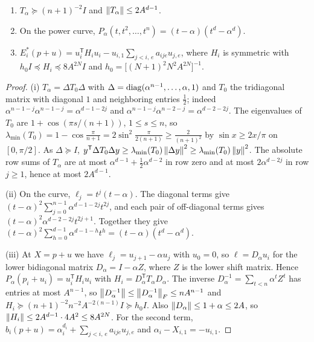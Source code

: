 \begin{lemma}
\label{lem:reductions-local-exposing}
\leavevmode
\begin{enumerate}[label=(\roman*)]
\item $T_\alpha\succeq(n+1)^{-2}I$ and $\left\lVert T_\alpha\right\rVert\le2A^{d-1}$.
\item On the power curve, $P_\alpha(t,t^2,\ldots,t^n)=(t-\alpha)(t^d-\alpha^d)$.
\item $E_i^*(p+u)=u_i^{\mathsf T}H_iu_i-u_{i,1}\sum_{j<i,\,e}a_{ije}u_{j,e}$, where
$H_i$ is symmetric with $h_0I\preceq H_i\preceq8A^{2N}I$ and
$h_0=\bigl[(N+1)^2N^2A^{2N}\bigr]^{-1}$.
\end{enumerate}
\end{lemma}

\begin{proof}
(i) $T_\alpha=\Delta T_0\Delta$ with $\Delta=\operatorname{diag}(\alpha^{n-1},\ldots,\alpha,1)$
and $T_0$ the tridiagonal matrix with diagonal $1$ and neighboring entries
$\frac12$; indeed
$\alpha^{n-1-j}\alpha^{n-1-j}=\alpha^{d-1-2j}$ and
$\alpha^{n-1-j}\alpha^{n-2-j}=\alpha^{d-2-2j}$. The eigenvalues of $T_0$ are
$1+\cos(\pi s/(n+1))$, $1\le s\le n$, so
$\lambda_{\min}(T_0)=1-\cos\frac{\pi}{n+1}=2\sin^2\frac{\pi}{2(n+1)}\ge\frac2{(n+1)^2}$
by $\sin x\ge2x/\pi$ on $[0,\pi/2]$. As $\Delta\succeq I$,
$y^{\mathsf T}\Delta T_0\Delta y\ge\lambda_{\min}(T_0)\left\lVert\Delta y\right\rVert^2\ge
\lambda_{\min}(T_0)\left\lVert y\right\rVert^2$. The absolute row sums of $T_\alpha$ are at most
$\alpha^{d-1}+\frac12\alpha^{d-2}$ in row zero and at most $2\alpha^{d-2j}$ in row
$j\ge1$, hence at most $2A^{d-1}$.

(ii) On the curve, $\ell_j=t^j(t-\alpha)$. The diagonal terms give
$(t-\alpha)^2\sum_{j=0}^{n-1}\alpha^{d-1-2j}t^{2j}$, and each pair of off-diagonal
terms gives $(t-\alpha)^2\alpha^{d-2-2j}t^{2j+1}$. Together they give
$(t-\alpha)^2\sum_{h=0}^{d-1}\alpha^{d-1-h}t^h=(t-\alpha)(t^d-\alpha^d)$.

(iii) At $X=p+u$ we have $\ell_j=u_{j+1}-\alpha u_j$ with $u_0=0$, so
$\ell=D_\alpha u_i$ for the lower bidiagonal matrix $D_\alpha=I-\alpha Z$, where
$Z$ is the lower shift matrix. Hence $P_\alpha(p_i+u_i)=u_i^{\mathsf T}H_iu_i$ with
$H_i=D_\alpha^{\mathsf T}T_\alpha D_\alpha$. The inverse
$D_\alpha^{-1}=\sum_{t<n}\alpha^tZ^t$ has entries at most $A^{n-1}$, so
$\left\lVert D_\alpha^{-1}\right\rVert\le\left\lVert D_\alpha^{-1}\right\rVert_F\le nA^{n-1}$ and
$H_i\succeq(n+1)^{-2}n^{-2}A^{-2(n-1)}I\succeq h_0I$. Also
$\left\lVert D_\alpha\right\rVert\le1+\alpha\le2A$, so $\left\lVert H_i\right\rVert\le2A^{d-1}\cdot4A^2\le8A^{2N}$.
For the second term, $b_i(p+u)=\alpha_i^{d_i}+\sum_{j<i,\,e}a_{ije}u_{j,e}$ and
$\alpha_i-X_{i,1}=-u_{i,1}$.
\end{proof}


